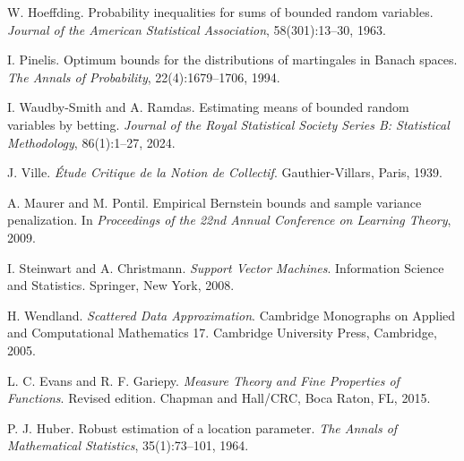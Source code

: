 W. Hoeffding.
\newblock Probability inequalities for sums of bounded random variables.
\newblock \emph{Journal of the American Statistical Association}, 58(301):13--30, 1963.

I. Pinelis.
\newblock Optimum bounds for the distributions of martingales in {B}anach spaces.
\newblock \emph{The Annals of Probability}, 22(4):1679--1706, 1994.

I. Waudby-Smith and A. Ramdas.
\newblock Estimating means of bounded random variables by betting.
\newblock \emph{Journal of the Royal Statistical Society Series B: Statistical Methodology}, 86(1):1--27, 2024.

J. Ville.
\newblock \emph{\'Etude Critique de la Notion de Collectif}.
\newblock Gauthier-Villars, Paris, 1939.

A. Maurer and M. Pontil.
\newblock Empirical {B}ernstein bounds and sample variance penalization.
\newblock In \emph{Proceedings of the 22nd Annual Conference on Learning Theory}, 2009.

I. Steinwart and A. Christmann.
\newblock \emph{Support Vector Machines}.
\newblock Information Science and Statistics. Springer, New York, 2008.


H. Wendland.
\newblock \emph{Scattered Data Approximation}.
\newblock Cambridge Monographs on Applied and Computational Mathematics 17. Cambridge University Press, Cambridge, 2005.

L. C. Evans and R. F. Gariepy.
\newblock \emph{Measure Theory and Fine Properties of Functions}.
\newblock Revised edition. Chapman and Hall/CRC, Boca Raton, FL, 2015.

P. J. Huber.
\newblock Robust estimation of a location parameter.
\newblock \emph{The Annals of Mathematical Statistics}, 35(1):73--101, 1964.

